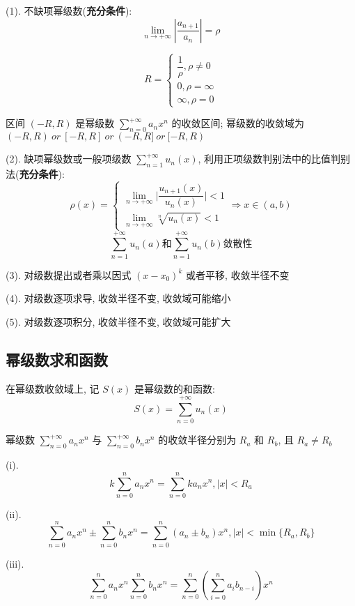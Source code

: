 \begin{theorem}[收敛域和收敛半径]
	(1). 不缺项幂级数(\textbf{充分条件}): 
	$$\lim\limits_{n\to +\infty}|\dfrac{a_{n+1}}{a_{n}}|=\rho$$
	
	$$R = \begin{cases}
		\dfrac{1}{\rho},\rho \neq 0 \\
		0,\rho = \infty            \\
		\infty,\rho = 0
	\end{cases}$$

	区间 $(-R,R)$ 是幂级数 $\sum\limits_{n=0}^{+\infty}a_{n}x^{n}$ 的收敛区间; 
	幂级数的收敛域为 $(-R,R) \ or \ [-R,R]\ or\ (-R,R] \ or\ [-R,R) $

	(2). 缺项幂级数或一般项级数 $\sum\limits_{n=1}^{+\infty}u_{n}(x)$, 利用正项级数判别法中的比值判别法(\textbf{充分条件}):
	$$\rho(x) = \begin{cases}
		\lim\limits_{n \to +\infty} \big|\dfrac{u_{n+1}(x)}{u_{n}(x)}\big| < 1\\
		\lim\limits_{n \to +\infty}\sqrt[n]{u_{n}(x)} < 1
	\end{cases}\Rightarrow
	x\in (a,b)
	$$
	$$\sum\limits_{n=1}^{+\infty}u_{n}(a)\text{和}\sum\limits_{n=1}^{+\infty}u_{n}(b) \text{敛散性}$$

	(3). 对级数提出或者乘以因式 $(x-x_{0})^{k}$ 或者平移, 收敛半径不变

	(4). 对级数逐项求导, 收敛半径不变, 收敛域可能缩小

	(5). 对级数逐项积分, 收敛半径不变, 收敛域可能扩大
\end{theorem}


\subsection{幂级数求和函数}
\begin{definition}[幂级数的和函数]
	在幂级数收敛域上, 记 $S(x)$ 是幂级数的和函数:
	$$S(x)=\sum\limits_{n=0}^{+\infty}u_{n}(x)$$
\end{definition}
\begin{theorem}[运算法则]
	幂级数 $\sum\limits_{n=0}^{+\infty}a_{n}x^{n}$ 与 $\sum\limits_{n=0}^{+\infty}b_{n}x^{n}$ 的收敛半径分别为 $R_{a}$ 和 $R_{b}$, 且 $R_{a}\neq R_{b}$

	(i). $$k \sum\limits_{n=0}^{n}a_{n}x^{n} = \sum\limits_{n=0}^{n}ka_{n}x^{n}, |x| < R_{a}$$

	(ii). $$\sum\limits_{n=0}^{n}a_{n}x^{n} \pm \sum\limits_{n=0}^{n}b_{n}x^{n} = \sum\limits_{n=0}^{n}(a_{n}\pm b_{n})x^{n}, |x| < \min\{R_{a}, R_{b}\}$$

	(iii). $$\sum\limits_{n=0}^{n}a_{n}x^{n}\sum\limits_{n=0}^{n}b_{n}x^{n} = \sum\limits_{n=0}^{n} \left(\sum\limits_{i=0}^{n}a_{i}b_{n-i}\right) x^{n}$$
\end{theorem}

